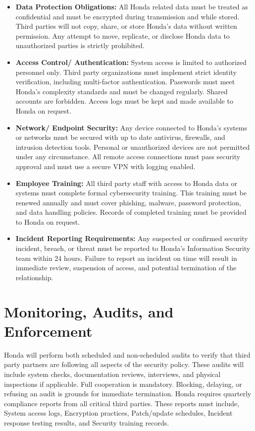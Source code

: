 \begin{itemize}
    \item \textbf{Data Protection Obligations:}  All Honda related data must be treated as confidential and must be encrypted during transmission and while stored. Third parties will not copy, share, or store Honda’s data without written permission. Any attempt to move, replicate, or disclose Honda data to unauthorized parties is strictly prohibited.
    
    \item \textbf{Access Control/ Authentication:}  System access is limited to authorized personnel only. Third party organizations must implement strict identity verification, including multi-factor authentication. Passwords must meet Honda’s complexity standards and must be changed regularly. Shared accounts are forbidden. Access logs must be kept and made available to Honda on request.

     \item \textbf{Network/ Endpoint Security:} Any device connected to Honda’s systems or networks must be secured with up to date antivirus, firewalls, and intrusion detection tools. Personal or unauthorized devices are not permitted under any circumstance. All remote access connections must pass security approval and must use a secure VPN with logging enabled.

    \item \textbf{Employee Training:}  All third party staff with access to Honda data or systems must complete formal cybersecurity training. This training must be renewed annually and must cover phishing, malware, password protection, and data handling policies. Records of completed training must be provided to Honda on request.

    \item \textbf{Incident Reporting Requirements:}  Any suspected or confirmed security incident, breach, or threat must be reported to Honda’s Information Security team within 24 hours. Failure to report an incident on time will result in immediate review, suspension of access, and potential termination of the relationship.

\end{itemize}

\section{Monitoring, Audits, and Enforcement}
Honda will perform both scheduled and non-scheduled audits to verify that third party partners are following all aspects of the security policy. These audits will include system checks, documentation reviews, interviews, and physical inspections if applicable. Full cooperation is mandatory. Blocking, delaying, or refusing an audit is grounds for immediate termination. Honda requires quarterly compliance reports from all critical third parties. These reports must include, System access logs, Encryption practices, Patch/update schedules, Incident response testing results, and Security training records.


